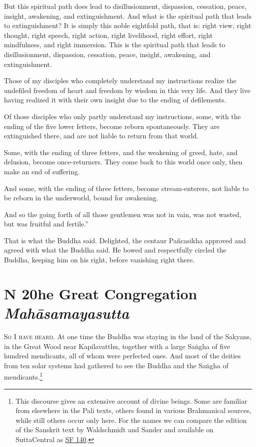 \documentclass[12pt,openany]{book}%
\newcommand*{\suttatitleacronym}[1]{\smaller[2]{#1}\vspace*{.3em}}
\newcommand*{\suttatitletranslation}[1]{\linebreak{#1}}
\newcommand*{\suttatitleroot}[1]{\linebreak\smaller[2]\itshape{#1}}
\newcommand*{\tocacronym}[1]{\hspace*{-3.3em}{#1}\quad}
\newcommand*{\toctranslation}[1]{#1}
\newcommand*{\tocroot}[1]{(\textit{#1})}
\newcommand*{\scevam}[1]{\textsc{#1}}
\renewcommand*{\tocacronym}[1]{\hspace*{0em}{#1}\quad}%
\begin{document}
But this spiritual path does lead to disillusionment, dispassion, cessation, peace, insight, awakening, and extinguishment. And what is the spiritual path that leads to extinguishment? It is simply this noble eightfold path, that is: right view, right thought, right speech, right action, right livelihood, right effort, right mindfulness, and right immersion. This is the spiritual path that leads to disillusionment, dispassion, cessation, peace, insight, awakening, and extinguishment. 

Those of my disciples who completely understand my instructions realize the undefiled freedom of heart and freedom by wisdom in this very life. And they live having realized it with their own insight due to the ending of defilements. 

Of those disciples who only partly understand my instructions, some, with the ending of the five lower fetters, become reborn spontaneously. They are extinguished there, and are not liable to return from that world. 

Some, with the ending of three fetters, and the weakening of greed, hate, and delusion, become once-returners. They come back to this world once only, then make an end of suffering. 

And some, with the ending of three fetters, become stream-enterers, not liable to be reborn in the underworld, bound for awakening. 

And so the going forth of all those gentlemen was not in vain, was not wasted, but was fruitful and fertile.” 

That is what the Buddha said. Delighted, the centaur \textsanskrit{Pañcasikha} approved and agreed with what the Buddha said. He bowed and respectfully circled the Buddha, keeping him on his right, before vanishing right there. 

%
\chapter*{{\suttatitleacronym DN 20}{\suttatitletranslation The Great Congregation }{\suttatitleroot Mahāsamayasutta}}
\addcontentsline{toc}{chapter}{\tocacronym{DN 20} \toctranslation{The Great Congregation } \tocroot{Mahāsamayasutta}}

\scevam{So I have heard. }At one time the Buddha was staying in the land of the Sakyans, in the Great Wood near Kapilavatthu, together with a large \textsanskrit{Saṅgha} of five hundred mendicants, all of whom were perfected ones. And most of the deities from ten solar systems had gathered to see the Buddha and the \textsanskrit{Saṅgha} of mendicants.\footnote{This discourse gives an extensive account of divine beings. Some are familiar from elsewhere in the Pali texts, others found in various Brahmanical sources, while still others occur only here. For the names we can compare the edition of the Sanskrit text by Waldschmidt and Sander and available on SuttaCentral as \href{https://suttacentral.net/sf140/san/waldschmidt-sander}{SF 140}. } 
\end{document}
